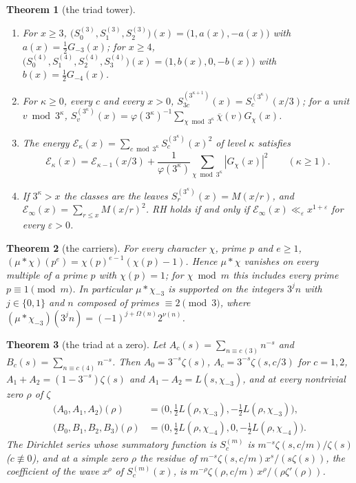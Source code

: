 \documentclass[11pt]{article}
\newtheorem{theorem}{Theorem}[section]
\theoremstyle{definition}\newtheorem{definition}[theorem]{Definition}
\theoremstyle{remark}\newtheorem{remark}[theorem]{Remark}
\theoremstyle{definition}\newtheorem{axiom}{Axiom}
\begin{document}
\begin{theorem}[the triad tower]\label{mt:tower}
\begin{enumerate}[label=\textup{(\roman*)}]
\item For $x\ge3$, $\bigl(S^{(3)}_0,S^{(3)}_1,S^{(3)}_2\bigr)(x)=\bigl(1,a(x),-a(x)\bigr)$ with $a(x)=\frac12G_{-3}(x)$; for $x\ge4$, $\bigl(S^{(4)}_0,S^{(4)}_1,S^{(4)}_2,S^{(4)}_3\bigr)(x)=\bigl(1,b(x),0,-b(x)\bigr)$ with $b(x)=\frac12G_{-4}(x)$.
\item For $\kappa\ge0$, every $c$ and every $x>0$, $S^{(3^{\kappa+1})}_{3c}(x)=S^{(3^\kappa)}_c(x/3)$; for a unit $v\bmod3^\kappa$, $S^{(3^\kappa)}_v(x)=\varphi(3^\kappa)^{-1}\sum_{\chi\bmod3^\kappa}\overline\chi(v)G_\chi(x)$.
\item The energy $\mathcal E_\kappa(x)=\sum_{c\bmod3^\kappa}S^{(3^\kappa)}_c(x)^2$ of level $\kappa$ satisfies
\begin{equation}\label{eq:energyrec}
\mathcal E_\kappa(x)=\mathcal E_{\kappa-1}(x/3)+\frac1{\varphi(3^\kappa)}\sum_{\chi\bmod3^\kappa}|G_\chi(x)|^2\qquad(\kappa\ge1).
\end{equation}
\item If $3^\kappa>x$ the classes are the leaves $S^{(3^\kappa)}_r(x)=M(x/r)$, and $\mathcal E_\infty(x)=\sum_{r\le x}M(x/r)^2$. RH holds if and only if $\mathcal E_\infty(x)\ll_\varepsilon x^{1+\varepsilon}$ for every $\varepsilon>0$.
\end{enumerate}
\end{theorem}

\begin{theorem}[the carriers]\label{mt:carriers}
For every character $\chi$, prime $p$ and $e\ge1$, $(\mu*\chi)(p^e)=\chi(p)^{e-1}(\chi(p)-1)$. Hence $\mu*\chi$ vanishes on every multiple of a prime $p$ with $\chi(p)=1$; for $\chi\bmod m$ this includes every prime $p\equiv1\pmod m$. In particular $\mu*\chi_{-3}$ is supported on the integers $3^jn$ with $j\in\{0,1\}$ and $n$ composed of primes $\equiv2\pmod3$, where $(\mu*\chi_{-3})(3^jn)=(-1)^{j+\Omega(n)}2^{\nu(n)}$.
\end{theorem}

\begin{theorem}[the triad at a zero]\label{mt:zero}
Let $A_c(s)=\sum_{n\equiv c\,(3)}n^{-s}$ and $B_c(s)=\sum_{n\equiv c\,(4)}n^{-s}$. Then $A_0=3^{-s}\zeta(s)$, $A_c=3^{-s}\zeta(s,c/3)$ for $c=1,2$, $A_1+A_2=(1-3^{-s})\zeta(s)$ and $A_1-A_2=L(s,\chi_{-3})$, and at every nontrivial zero $\rho$ of $\zeta$
\begin{align*}
\bigl(A_0,A_1,A_2\bigr)(\rho)&=\bigl(0,\tfrac12L(\rho,\chi_{-3}),-\tfrac12L(\rho,\chi_{-3})\bigr),\\
\bigl(B_0,B_1,B_2,B_3\bigr)(\rho)&=\bigl(0,\tfrac12L(\rho,\chi_{-4}),0,-\tfrac12L(\rho,\chi_{-4})\bigr).
\end{align*}
The Dirichlet series whose summatory function is $S^{(m)}_c$ is $m^{-s}\zeta(s,c/m)/\zeta(s)$ ($c\not\equiv0$), and at a simple zero $\rho$ the residue of $m^{-s}\zeta(s,c/m)x^s/(s\zeta(s))$, the coefficient of the wave $x^\rho$ of $S^{(m)}_c(x)$, is $m^{-\rho}\zeta(\rho,c/m)\,x^\rho/(\rho\zeta'(\rho))$.
\end{theorem}
\end{document}
